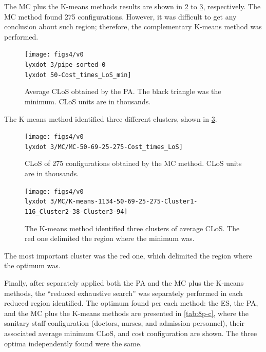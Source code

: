 \documentclass[11pt]{article} %
\begin{document}
The MC plus the K-means methods results are shown in \ref{subfig:mc8-3}
to \ref{subfig:km8-3}, respectively. The MC method found 275 configurations.
However, it was difficult to get any conclusion about such region;
therefore, the complementary K-means method was performed.
\begin{figure}[H]
\centering{}\texttt{[image: figs4/v0\\lyxdot 3/pipe-sorted-0\\lyxdot 50-Cost\_times\_LoS\_min]}\caption{Average CLoS obtained by the PA. The black triangle was the minimum.
CLoS units are in thousands. \label{subfig:pipe8-3} }
\end{figure}
The K-means method identified three different clusters, shown in \ref{subfig:km8-3}.
\begin{figure}[H]
\centering{}\texttt{[image: figs4/v0\\lyxdot 3/MC/MC-50-69-25-275-Cost\_times\_LoS]}\caption{CLoS of 275 configurations obtained by the MC method. CLoS units are
in thousands. \label{subfig:mc8-3}}
\end{figure}
\begin{figure}[H]
\begin{centering}
\texttt{[image: figs4/v0\\lyxdot 3/MC/K-means-1134-50-69-25-275-Cluster1-116\_Cluster2-38-Cluster3-94]}
\par\end{centering}

\caption{The K-means method identified three clusters of average CLoS. The
red one delimited the region where the minimum was. \label{subfig:km8-3}}
\end{figure}
 The most important cluster was the red one, which delimited the region
where the optimum was. 

Finally, after separately applied both the PA and the MC plus the
K-means methods, the \textquotedblleft{}reduced exhaustive search\textquotedblright{}
was separately performed in each reduced region identified. The optimum
found per each method: the ES, the PA, and the MC plus the K-means
methods are presented in \ref{tab:8p-c}, where the sanitary staff
configuration (doctors, nurses, and admission personnel), their associated
average minimum CLoS, and cost configuration are shown. The three
optima independently found were the same.
\end{document}
